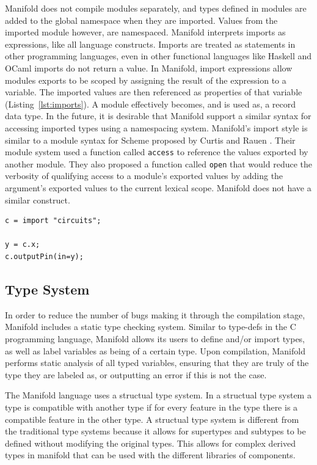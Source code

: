 Manifold does not compile modules separately, and types defined in modules are
added to the global namespace when they are imported. Values from the imported
module however, are namespaced. Manifold interprets imports as expressions,
like all language constructs. Imports are treated as statements in other
programming languages, even in other functional languages like Haskell and
OCaml imports do not return a value.  In Manifold, import expressions allow modules
exports to be scoped by assigning the result of the expression
to a variable. The imported values are then referenced as properties of that
variable (Listing~\ref{lst:imports}). A module effectively becomes, and is used as,
a
record data type. In the future, it is desirable that Manifold support a
similar syntax for accessing imported types using a namespacing system.
Manifold's import style is similar to a module syntax for Scheme proposed by
Curtis and Rauen \cite{Curtis:1990:MSS:91556.91573}. Their module system used
a function called \texttt{access} to reference the values exported by another
module. They also proposed a function called \texttt{open} that would reduce
the verbosity of qualifying access to a module's exported values by adding the
argument's exported values to the current lexical scope. Manifold does not
have a similar construct.

\begin{lstlisting}[label=lst:imports, caption=A module imported into a Manifold file]
c = import "circuits";

y = c.x;
c.outputPin(in=y);
\end{lstlisting}

\subsection{Type System}

In order to reduce the number of bugs making it through the compilation stage, Manifold includes a static type checking system. Similar to type-defs in the C programming language, Manifold allows its users to define and/or import types, as well as label variables as being of a certain type. Upon compilation, Manifold performs static analysis of all typed variables, ensuring that they are truly of the type they are labeled as, or outputting an error if this is not the case.

The Manifold language uses a structual type system. In a structual type system a type is compatible with another type if for every feature in the type there is a compatible feature in the other type. A structual type system is different from the traditional type systems because it allows for supertypes and subtypes to be defined without modifying the original types. This allows for complex derived types in manifold that can be used with the different libraries of components.

